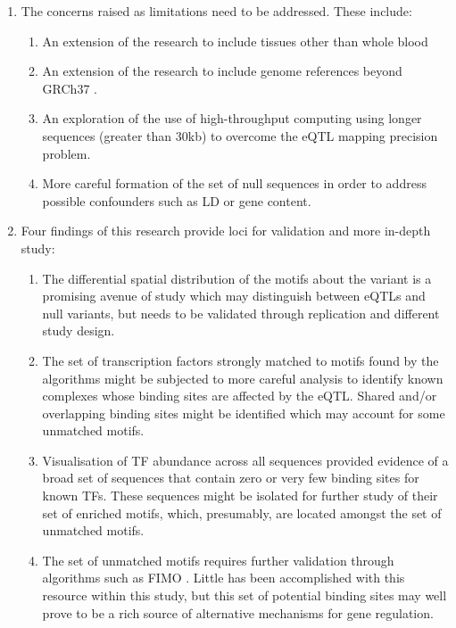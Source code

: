 \documentclass[12pt]{article}
\begin{document}
\begin{enumerate}
\item The concerns raised as limitations need to be addressed. These include:
\begin{enumerate}
\item An extension of the research to include tissues other than whole blood 
\item An extension of the research to include genome references beyond GRCh37 \citep{Lander2001}. 
\item An exploration of the use of high-throughput computing using longer sequences (greater than 30kb) to overcome the eQTL mapping precision problem. 
\item More careful formation of the set of null sequences in order to address possible confounders such as LD or gene content.
\end{enumerate}
\item Four findings of this research provide loci for validation and more in-depth study:
\begin{enumerate}
\item The differential spatial distribution of the motifs about the variant is a promising avenue of study which may distinguish between eQTLs and null variants, but needs to be validated through replication and different study design.

\item The set of transcription factors strongly matched to motifs found by the algorithms might be subjected to more careful analysis to identify known complexes whose binding sites are affected by the eQTL. Shared and/or overlapping binding sites might be identified which may account for some unmatched motifs.

\item Visualisation of TF abundance across all sequences provided evidence of a broad set of sequences that contain zero or very few binding sites for known TFs. These sequences might be isolated for further study of their set of enriched motifs, which, presumably, are located amongst the set of unmatched motifs.

\item The set of unmatched motifs requires further validation through algorithms such as FIMO \citep{Grant2011}. Little has been accomplished with this resource within this study, but this set of potential binding sites may well prove to be a rich source of alternative mechanisms for gene regulation. 
\end{enumerate}
\end{enumerate}
\end{document}
